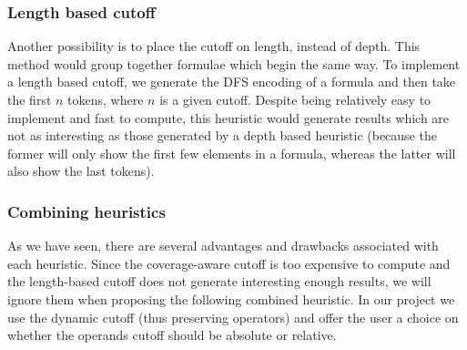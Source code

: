 \subsubsection{Length based cutoff}\label{subsubsec:length_based_cutoff}
Another possibility is to place the cutoff on length, instead of depth. This
method would group together formulae which begin the same way. To implement
a length based cutoff, we generate the DFS encoding of a formula and then take
the first $n$ tokens, where $n$ is a given cutoff. Despite being relatively
easy to implement and fast to compute, this heuristic would generate results
which are not as interesting as those generated by a depth based heuristic
(because the former will only show the first few elements in a formula, whereas
the latter will also show the last tokens).

\subsubsection{Combining heuristics}\label{subsubsec:combining_cutoffs}
As we have seen, there are several advantages and drawbacks associated with
each heuristic. Since the coverage-aware cutoff is too expensive to compute and
the length-based cutoff does not generate interesting enough results, we
will ignore them when proposing the following combined heuristic. In our
project we use the dynamic cutoff (thus preserving operators) and offer the
user a choice on whether the operands cutoff should be absolute or relative.



